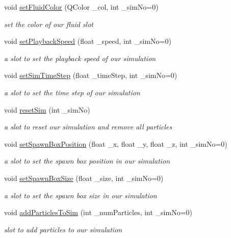 \begin{DoxyCompactItemize}
void \hyperlink{class_open_g_l_widget_a559ba717c412258c234ce5865c0b6976}{set\-Fluid\-Color} (Q\-Color \-\_\-col, int \-\_\-sim\-No=0)
\begin{DoxyCompactList}\small\item\em set the color of our fluid slot \end{DoxyCompactList}\item 
void \hyperlink{class_open_g_l_widget_a3c415ea6ecc1ccf6df49b08df74bbd1a}{set\-Playback\-Speed} (float \-\_\-speed, int \-\_\-sim\-No=0)
\begin{DoxyCompactList}\small\item\em a slot to set the playback speed of our simulation \end{DoxyCompactList}\item 
void \hyperlink{class_open_g_l_widget_ac8a71d325740372032c0061d3bf1daa0}{set\-Sim\-Time\-Step} (float \-\_\-time\-Step, int \-\_\-sim\-No=0)
\begin{DoxyCompactList}\small\item\em a slot to set the time step of our simulation \end{DoxyCompactList}\item 
void \hyperlink{class_open_g_l_widget_acc54210918549bd628db0080d576b483}{reset\-Sim} (int \-\_\-sim\-No)
\begin{DoxyCompactList}\small\item\em a slot to reset our simulation and remove all particles \end{DoxyCompactList}\item 
void \hyperlink{class_open_g_l_widget_ac4d67ea702f268f7d072e94a569cb5f0}{set\-Spawn\-Box\-Position} (float \-\_\-x, float \-\_\-y, float \-\_\-z, int \-\_\-sim\-No=0)
\begin{DoxyCompactList}\small\item\em a slot to set the spawn box position in our simulation \end{DoxyCompactList}\item 
void \hyperlink{class_open_g_l_widget_a60e5e6f2845384c3faeaa11c0fb800b4}{set\-Spawn\-Box\-Size} (float \-\_\-size, int \-\_\-sim\-No=0)
\begin{DoxyCompactList}\small\item\em a slot to set the spawn box size in our simulation \end{DoxyCompactList}\item 
void \hyperlink{class_open_g_l_widget_adce23eb4fa8b5a1d1ac0403c911abb37}{add\-Particles\-To\-Sim} (int \-\_\-num\-Particles, int \-\_\-sim\-No=0)
\begin{DoxyCompactList}\small\item\em slot to add particles to our simulation \end{DoxyCompactList}\end{DoxyCompactItemize}

